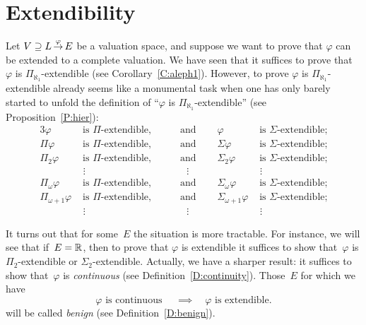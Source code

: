 \documentclass[main.tex]{subfiles}
\begin{document}
\section{Extendibility}
\label{S:benign}
Let 
$V \supseteq L\,\smash{\stackrel{\varphi}{\rightarrow}}\,E$
be a valuation space,
and suppose we want to prove
that $\varphi$ can be extended to a complete valuation.
We have seen
that it suffices to prove that~$\varphi$
is $\Pi_{\aleph_1}$-extendible
(see Corollary~\ref{C:aleph1}).
However,
to prove $\varphi$ is $\Pi_{\aleph_1}$-extendible
already
seems like a monumental task
when one has only barely started
to unfold
the definition of ``$\varphi$ is $\Pi_{\aleph_1}$-extendible''
(see Proposition~\ref{P:hier}):
\begin{alignat*}{3}
\varphi &\text{ is $\Pi$-extendible,}&
\quad&\text{ and }\quad& \varphi &\text{ is $\Sigma$-extendible;}\\
\Pi\varphi &\text{ is $\Pi$-extendible,}&
\quad&\text{ and }\quad& \Sigma\varphi &\text{ is $\Sigma$-extendible;}\\
\Pi_2\varphi &\text{ is $\Pi$-extendible,}&
\quad&\text{ and }\quad& \Sigma_2\varphi &\text{ is $\Sigma$-extendible;}\\
&\ \,\vdots&&\quad\vdots&&\ \,\vdots\\
\Pi_\omega\varphi &\text{ is $\Pi$-extendible,}&
\quad&\text{ and }\quad& \Sigma_\omega\varphi &\text{ is $\Sigma$-extendible;}\\
\Pi_{\omega+1}\varphi &\text{ is $\Pi$-extendible,}&
\quad&\text{ and }\quad& \Sigma_{\omega+1}\varphi
    &\text{ is $\Sigma$-extendible;}\\
&\ \,\vdots&&\quad\vdots&&\ \,\vdots
\end{alignat*}

It turns out
that for some~$E$
the situation is more tractable.
For instance,
we will see that if~$E=\mathbb{R}$,
then to prove that $\varphi$ is extendible
it suffices to show that~$\varphi$ is $\Pi_2$-extendible
or $\Sigma_2$-extendible.
Actually,
we have a sharper result:
it suffices to show that~$\varphi$ is \emph{continuous}
(see Definition~\ref{D:continuity}).
Those~$E$ for which we have 
\begin{equation*}
\varphi \text{ is continuous }
\quad\implies\quad
\varphi \text{ is extendible.}
\end{equation*}
will be called \emph{benign} (see Definition~\ref{D:benign}).
%
%
\end{document}
